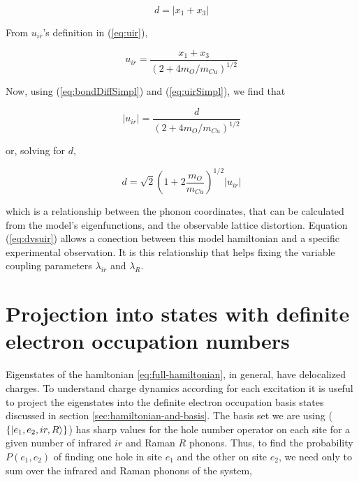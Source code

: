 \begin{equation}
  \label{eq:bondDiffSimpl}
  d=\left|x_1+x_3\right|
\end{equation}

From $u_{ir}$'s definition in (\ref{eq:uir}),

\begin{equation}
  \label{eq:uirSimpl}
  u_{ir}=\frac{x_1+x_3}{\left( 2+4 m_O/m_{Cu} \right)^{1/2}}
\end{equation}

Now, using (\ref{eq:bondDiffSimpl}) and (\ref{eq:uirSimpl}), we find that

\begin{equation}
  \label{eq:uirvsd}
  \left|u_{ir}\right|=\frac{d}{\left( 2+4 m_O/m_{Cu} \right)^{1/2}}
\end{equation}

\noindent or, solving for $d$,

\begin{equation}
  \label{eq:dvsuir}
  d=\sqrt{2}\left(1 + 2\frac{m_O}{m_{Cu}} \right)^{1/2}\left|u_{ir}\right|
\end{equation}

\noindent which is a relationship between the phonon coordinates, that can be calculated from the model's eigenfunctions, and the observable lattice distortion. 
Equation (\ref{eq:dvsuir}) allows a conection between this model hamiltonian and a specific experimental observation. 
It is this relationship that helps fixing the variable coupling parameters $\lambda_{ir}$ and $\lambda_R$.

\section{Projection into states with definite electron occupation numbers}
\label{sec:electronic-projection}

Eigenstates of the hamltonian \ref{eq:full-hamiltonian}, in general, have delocalized charges.
To understand charge dynamics according for each excitation it is useful to project the eigenstates into the definite electron occupation basis states discussed in section \ref{sec:hamiltonian-and-basis}.
The basis set we are using ($\{\left | e_1,e_2,ir,R \right\rangle\}$) has sharp values for the hole number operator on each site for a given number of infrared $ir$ and Raman $R$ phonons. 
Thus, to find the probability $P(e_1,e_2)$ of finding one hole in site $e_1$ and the other on site $e_2$, we need only to sum over the infrared and Raman phonons of the system,

